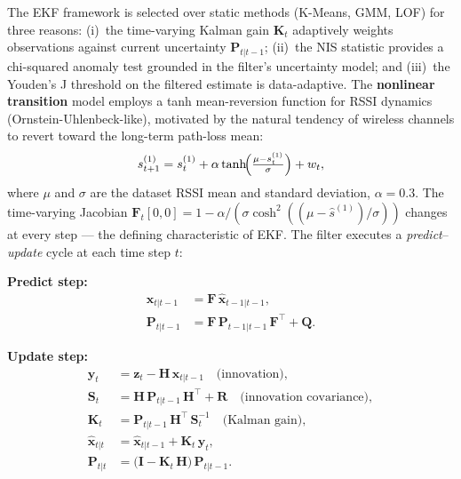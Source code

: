 \documentclass[12pt,a4paper]{article}
\begin{document}
The EKF framework is selected over static methods (K-Means, GMM, LOF)
for three reasons: (i)~the time-varying Kalman gain $\mathbf{K}_t$
adaptively weights observations against current uncertainty
$\mathbf{P}_{t|t-1}$; (ii)~the NIS statistic provides a chi-squared
anomaly test grounded in the filter's uncertainty model; and
(iii)~the Youden's J threshold on the filtered estimate is data-adaptive.
The \textbf{nonlinear transition} model employs a tanh mean-reversion
function for RSSI dynamics (Ornstein-Uhlenbeck-like), motivated by the
natural tendency of wireless channels to revert toward the long-term
path-loss mean:
\begin{equation}
s^{(1)}_{t+1} = s^{(1)}_t +
  \alpha\tanh\!\Bigl(\tfrac{\mu - s^{(1)}_t}{\sigma}\Bigr) + w_t,
\label{eq:tanh_transition}
\end{equation}
where $\mu$ and $\sigma$ are the dataset RSSI mean and standard deviation,
$\alpha{=}0.3$. The time-varying Jacobian
$\mathbf{F}_t[0,0] = 1 - \alpha/(\sigma\cosh^2((\mu-\hat{s}^{(1)})/\sigma))$
changes at every step — the defining characteristic of EKF.
The filter executes a \textit{predict}–\textit{update} cycle at each time
step $t$:

\vspace{4pt}
\noindent\textbf{Predict step:}
\begin{align}
\hat{\mathbf{x}}_{t|t-1} &= \mathbf{F}\,\hat{\mathbf{x}}_{t-1|t-1},
\label{eq:pred_x}\\
\mathbf{P}_{t|t-1} &= \mathbf{F}\,\mathbf{P}_{t-1|t-1}\,\mathbf{F}^\top + \mathbf{Q}.
\label{eq:pred_p}
\end{align}

\noindent\textbf{Update step:}
\begin{align}
\mathbf{y}_t &= \mathbf{z}_t - \mathbf{H}\,\hat{\mathbf{x}}_{t|t-1}
\quad\text{(innovation)},
\label{eq:innov}\\
\mathbf{S}_t &= \mathbf{H}\,\mathbf{P}_{t|t-1}\,\mathbf{H}^\top + \mathbf{R}
\quad\text{(innovation covariance)},
\label{eq:innov_cov}\\
\mathbf{K}_t &= \mathbf{P}_{t|t-1}\,\mathbf{H}^\top\,\mathbf{S}_t^{-1}
\quad\text{(Kalman gain)},
\label{eq:kgain}\\
\hat{\mathbf{x}}_{t|t} &= \hat{\mathbf{x}}_{t|t-1} + \mathbf{K}_t\,\mathbf{y}_t,
\label{eq:upd_x}\\
\mathbf{P}_{t|t} &= \bigl(\mathbf{I} - \mathbf{K}_t\,\mathbf{H}\bigr)\,\mathbf{P}_{t|t-1}.
\label{eq:upd_p}
\end{align}
\end{document}

